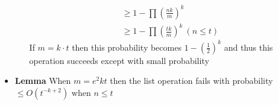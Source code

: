 \begin{itemize}
\begin{itemize}
\begin{align*}
                                       &\geq 1- \prod \left(\frac{nk}m\right)^k \\
                                       &\geq 1- \prod \left(\frac{tk}m\right)^k \ (n \leq t)
    \end{align*}
    If $m = k \cdot t$ then this probability becomes $1-\left(\frac12\right)^k$ and thus this operation succeeds except with small probability
  \end{itemize}
  \item \textbf{Lemma} When $m = e^2 k t$ then the list operation fails with probability $\leq O(t^{-k+2})$ when $n \leq t$ 
\end{itemize}    

\newpage
